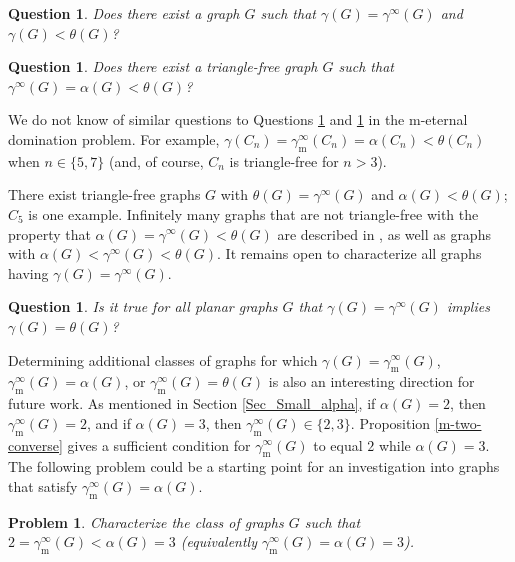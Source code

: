 \documentclass[12pt]{article}%
\newtheorem{problem}[theorem]{Problem}
\newtheorem{question}[theorem]{Question}
\begin{document}
\begin{question}
\label{main1} Does there exist a graph $G$ such that $\gamma(G)=\gamma
^{\infty}(G)$ and $\gamma(G)<\theta(G)$?
\end{question}

\begin{question}
\label{main2} Does there exist a triangle-free graph $G$ such that
$\gamma^{\infty}(G)=\alpha(G)<\theta(G)$?
\end{question}

We do not know of similar questions to Questions \ref{main1} and \ref{main2}
in the $\mathrm{m}$-eternal domination problem. For example, $\gamma
(C_{n})=\gamma_{\mathrm{m}}^{\infty}(C_{n})=\alpha(C_{n})<\theta(C_{n})$ when
$n\in\{5,7\}$ (and, of course, $C_{n}$ is triangle-free for $n>3$).

There exist triangle-free graphs $G$ with $\theta(G)=\gamma^{\infty}(G)$ and
$\alpha(G)<\theta(G)$; $C_{5}$ is one example. Infinitely many graphs that are
not triangle-free with the property that $\alpha(G)=\gamma^{\infty}%
(G)<\theta(G)$ are described in \cite{KM2}, as well as graphs with
$\alpha(G)<\gamma^{\infty}(G)<\theta(G)$. It remains open to characterize all
graphs having $\gamma(G)=\gamma^{\infty}(G)$.

\begin{question}
Is it true for all planar graphs $G$ that $\gamma(G)=\gamma^{\infty}(G)$
implies $\gamma(G)=\theta(G)$?
\end{question}

Determining additional classes of graphs for which $\gamma(G)=\gamma
_{\mathrm{m}}^{\infty}(G)$, $\gamma_{\mathrm{m}}^{\infty}(G)=\alpha(G)$, or
$\gamma_{\mathrm{m}}^{\infty}(G)=\theta(G)$ is also an interesting direction
for future work. As mentioned in Section \ref{Sec_Small_alpha}, if
$\alpha(G)=2$, then $\gamma_{\mathrm{m}}^{\infty}(G)=2$, and if $\alpha(G)=3$,
then $\gamma_{\mathrm{m}}^{\infty}(G)\in\{2,3\}$. Proposition
\ref{m-two-converse} gives a sufficient condition for $\gamma_{\mathrm{m}%
}^{\infty}(G)$ to equal $2$ while $\alpha(G)=3$. The following problem could
be a starting point for an investigation into graphs that satisfy
$\gamma_{\mathrm{m}}^{\infty}(G)=\alpha(G)$.

\begin{problem}
Characterize the class of graphs $G$ such that $2=\gamma_{\mathrm{m}}^{\infty
}(G)<\alpha(G)=3$ (equivalently $\gamma_{\mathrm{m}}^{\infty}(G)=\alpha(G)=3$).
\end{problem}
\end{document}
